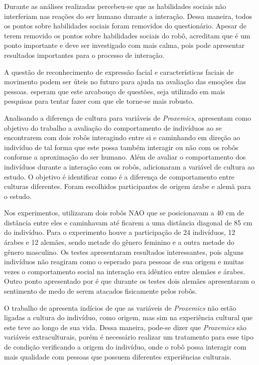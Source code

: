 Durante as análises realizadas percebeu-se que as habilidades sociais não interferiam nas reações do ser humano durante a interação. Dessa maneira, todos os pontos sobre habilidades sociais foram removidos do questionário. Apesar de terem removido os pontos sobre habilidades sociais do robô, \textcite{joosse:2011} acreditam que é um ponto importante e deve ser investigado com mais calma, pois pode apresentar resultados importantes para o processo de interação.

A questão de reconhecimento de expressão facial e características faciais de movimento podem ser úteis no futuro para ajuda na avaliação das emoções das pessoas. \textcite{joosse:2011} esperam que este arcabouço de questões, seja utilizado em mais pesquisas para tentar fazer com que ele torne-se mais robusto.

Analisando a diferença de cultura para variáveis de \emph{Proxemics}, \textcite{eresha:2013} apresentam como objetivo do trabalho a avaliação do comportamento de indivíduos ao se encontrarem com dois robôs interagindo entre si e caminhando em direção ao individuo de tal forma que este possa também interagir ou não com os robôs conforme a aproximação do ser humano. Além de avaliar o comportamento dos indivíduos durante a interação com os robôs, \textcite{eresha:2013} adicionaram a variável de cultura ao estudo. O objetivo é identificar como é a diferença de comportamento entre culturas diferentes. Foram escolhidos participantes de origem árabe e alemã para o estudo.

Nos experimentos, \textcite{eresha:2013} utilizaram dois robôs NAO que se posicionavam a 40 cm de distância entre eles e caminhavam até ficarem a uma distância diagonal de 85 cm do indivíduo. Para o experimento houve a participação de 24 indivíduos, 12 árabes e 12 alemães, sendo metade do gênero feminino e a outra metade do gênero masculino. Os testes apresentaram resultados interessantes, pois alguns indivíduos não reagiram como o esperado para pessoas de sua origem e muitas vezes o comportamento social na interação era idêntico entre alemães e árabes. Outro ponto apresentado por \textcite{eresha:2013} é que durante os testes dois alemães apresentaram o sentimento de medo de serem atacados fisicamente pelos robôs.

O trabalho de \textcite{eresha:2013} apresenta indícios de que as variáveis de \emph{Proxemics} não estão ligadas a cultura do indivíduo, como origem, mas sim na experiência cultural que este teve ao longo de sua vida. Dessa maneira, pode-se dizer que \emph{Proxemics} são variáveis extraculturais, porém é necessário realizar um tratamento para esse tipo de condição verificando a origem do indivíduo, onde o robô possa interagir com mais qualidade com pessoas que possuem diferentes experiências culturais.


